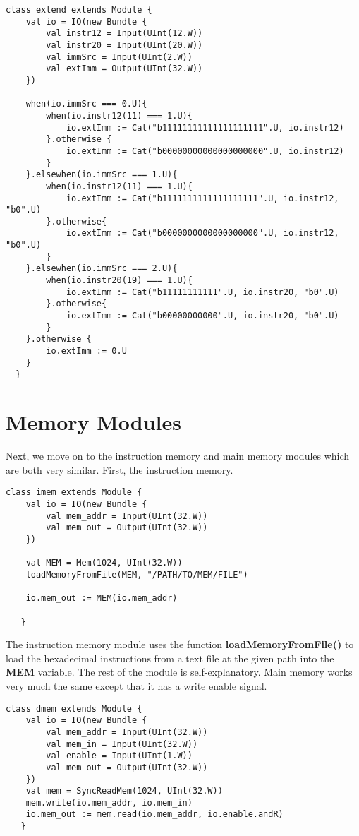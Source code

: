 \documentclass[12pt, letterpaper]{report}
\begin{document}
\begin{lstlisting}[style=scala]
   class extend extends Module {
    val io = IO(new Bundle {
        val instr12 = Input(UInt(12.W))
        val instr20 = Input(UInt(20.W))
        val immSrc = Input(UInt(2.W))
        val extImm = Output(UInt(32.W))
    })

    when(io.immSrc === 0.U){
        when(io.instr12(11) === 1.U){
            io.extImm := Cat("b11111111111111111111".U, io.instr12)
        }.otherwise {
            io.extImm := Cat("b00000000000000000000".U, io.instr12)
        }
    }.elsewhen(io.immSrc === 1.U){
        when(io.instr12(11) === 1.U){
            io.extImm := Cat("b1111111111111111111".U, io.instr12, "b0".U)
        }.otherwise{
            io.extImm := Cat("b0000000000000000000".U, io.instr12, "b0".U)
        }
    }.elsewhen(io.immSrc === 2.U){
        when(io.instr20(19) === 1.U){
            io.extImm := Cat("b11111111111".U, io.instr20, "b0".U)
        }.otherwise{
            io.extImm := Cat("b00000000000".U, io.instr20, "b0".U)
        }
    }.otherwise {
        io.extImm := 0.U
    }
  }
\end{lstlisting}




\section{Memory Modules}
Next, we move on to the instruction memory and main memory modules which are both very similar.
First, the instruction memory. 

\begin{lstlisting}[style=scala]
   class imem extends Module {
    val io = IO(new Bundle {
        val mem_addr = Input(UInt(32.W))
        val mem_out = Output(UInt(32.W))
    })

    val MEM = Mem(1024, UInt(32.W))
    loadMemoryFromFile(MEM, "/PATH/TO/MEM/FILE")

    io.mem_out := MEM(io.mem_addr)
    
   }
\end{lstlisting}

The instruction memory module uses the function \textbf{loadMemoryFromFile()} to load the 
hexadecimal instructions from a text file at the given path into the \textbf{MEM} variable.
The rest of the module is self-explanatory. Main memory works very much the same except
that it has a write enable signal. 

\begin{lstlisting}[style=scala]
   class dmem extends Module {
    val io = IO(new Bundle {
        val mem_addr = Input(UInt(32.W))
        val mem_in = Input(UInt(32.W))
        val enable = Input(UInt(1.W))
        val mem_out = Output(UInt(32.W))
    })
    val mem = SyncReadMem(1024, UInt(32.W))
    mem.write(io.mem_addr, io.mem_in)
    io.mem_out := mem.read(io.mem_addr, io.enable.andR)
   }
\end{lstlisting}
\end{document}
